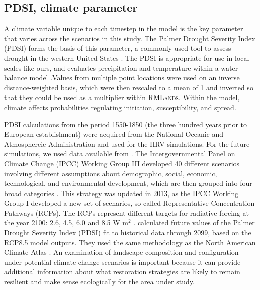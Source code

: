 \documentclass[12pt]{article}
\begin{document}
\begin{spacing}{1}
\subsection*{PDSI, climate parameter}
A climate variable unique to each timestep in the model is the key parameter that varies across the scenarios in this study. The Palmer Drought Severity Index (PDSI) forms the basis of this parameter, a commonly used tool to assess drought in the western United States \citep{Cook2004}. The PDSI is appropriate for use in local scales like ours, and evaluates precipitation and temperature within a water balance model \citep{HeimJr2002}.Values from multiple point locations were used on an inverse distance-weighted basis, which were then rescaled to a mean of 1 and inverted so that they could be used as a multiplier within \textsc{RMLands}. Within the model, climate affects probabilities regulating initiation, susceptibility, and spread. 

PDSI calculations from the period 1550-1850 (the three hundred years prior to European establishment) were acquired from the National Oceanic and Atmosphereic Administration and used for the HRV simulations. For the future simulations, we used data available from \citet{Cook2014}. The Intergovernmental Panel on Climate Change (IPCC) Working Group III developed 40 different scenarios involving different assumptions about demographic, social, economic, technological, and environmental development, which are then grouped into four broad categories \citep{Nakicenovic2000}. This strategy was updated in 2013, as the IPCC Working Group I developed a new set of scenarios, so-called Representative Concentration Pathways (RCPs). The RCPs represent different targets for radiative forcing at the year 2100: 2.6, 4.5, 6.0 and 8.5 W m$^2$ \citep{Stocker2013}. \citet{Cook2014} calculated future values of the Palmer Drought Severity Index (PDSI) fit to historical data through 2099, based on the RCP8.5 model outputs. They used the same methodology as the North American Climate Atlas \citep{Cook2004}. An examination of landscape composition and configuration under potential climate change scenarios is important because it can provide additional information about what restoration strategies are likely to remain resilient and make sense ecologically for the area under study. 


\end{spacing}
\end{document}
